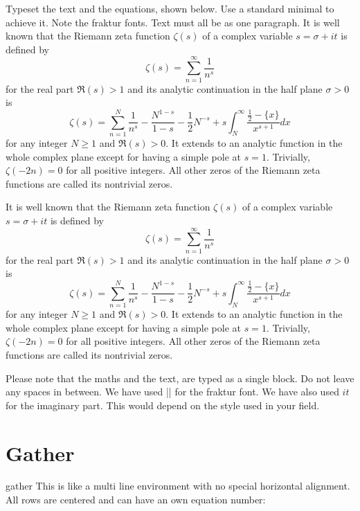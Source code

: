 {\begin{casestudy}{%
Typeset the text and the equations, shown below. Use a standard minimal to achieve it. Note the fraktur fonts. Text must all be as one paragraph.}
It is well known that the Riemann zeta function $\zeta(s)$ of a complex variable $s=\sigma+it$ is defined by
\[
\zeta(s)=\sum_{n=1}^{\infty}\frac{1}{n^{s}}
\]
for the real part $\mathfrak{R}(s)>1$ and its analytic continuation in the half plane $\sigma>0$ is
\begin{equation}\label{func:zeta}
\zeta(s)=\sum_{n=1}^{N}\frac{1}{n^{s}}-\frac{N^{1-s}}{1-s}-\frac{1}{2}N^{-s}
+s\int_{N}^{\infty}\frac{\frac{1}{2}-\{x\}}{x^{s+1}}dx
\end{equation}
for any integer $N\geq1$ and $\mathfrak{R}(s)>0$.
It extends to an analytic function in the whole complex plane except for having a simple pole at $s=1$. Trivially, $\zeta(-2n)=0$ for all positive integers. All other zeros of the Riemann zeta functions are called its nontrivial zeros.
\bottomline

\begin{teX}
It is well known that the Riemann zeta function $\zeta(s)$ of a complex variable $s=\sigma+it$ is defined by
\[
\zeta(s)=\sum_{n=1}^{\infty}\frac{1}{n^{s}}
\]
for the real part $\mathfrak{R}(s)>1$ and its analytic continuation in the half plane $\sigma>0$ is
\begin{equation}\label{func:zeta}
\zeta(s)=\sum_{n=1}^{N}\frac{1}{n^{s}}-\frac{N^{1-s}}{1-s}-\frac{1}{2}N^{-s}
+s\int_{N}^{\infty}\frac{\frac{1}{2}-\{x\}}{x^{s+1}}dx
\end{equation}
for any integer $N\geq1$ and $\mathfrak{R}(s)>0$.
It extends to an analytic function in the whole complex plane except for having a simple pole at $s=1$. Trivially, $\zeta(-2n)=0$ for all positive integers. All other zeros of the Riemann zeta functions are called its nontrivial zeros.
\end{teX}

Please note that the maths and the text, are typed as a single block. Do not leave any spaces in between. We have used |\mathfrak| for the fraktur font. We have also used $it$ for the imaginary part. This would depend on the style used in your field. 
\end{casestudy}

\clearpage
\section{Gather}

\begin{docEnvironment}{gather}{}
This is like a multi line environment with no special horizontal alignment. All rows
are centered and can have an own equation number:
\end{docEnvironment}

}
